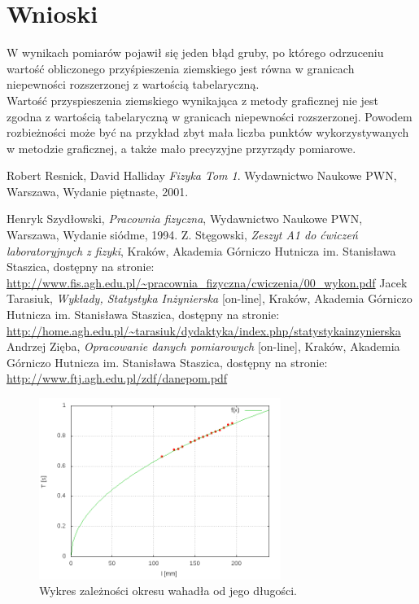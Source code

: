 \documentclass{article}
\begin{document}
\section{Wnioski}
	W wynikach pomiarów pojawił się jeden błąd gruby, po którego odrzuceniu wartość obliczonego przyśpieszenia ziemskiego jest równa w granicach niepewności rozszerzonej z wartością tabelaryczną. \\
	Wartość przyspieszenia ziemskiego wynikająca z metody graficznej nie jest zgodna z wartością tabelaryczną w granicach niepewności rozszerzonej. Powodem rozbieżności może być na przykład zbyt mała liczba punktów wykorzystywanych w metodzie graficznej, a także mało precyzyjne przyrządy pomiarowe. 
	



\begin{thebibliography}{9}
 
  Robert Resnick, David Halliday
  \emph{Fizyka Tom 1}.
    Wydawnictwo Naukowe PWN, Warszawa,
  Wydanie piętnaste,
  2001.


 Henryk Szydłowski,
 \emph{Pracownia fizyczna}, Wydawnictwo Naukowe PWN, Warszawa, Wydanie siódme, 1994.
  Z. Stęgowski,
  \emph{Zeszyt A1 do ćwiczeń laboratoryjnych z fizyki}, Kraków, Akademia Górniczo Hutnicza im. Stanisława Staszica, dostępny na stronie:\\
  \url{http://www.fis.agh.edu.pl/~pracownia_fizyczna/cwiczenia/00_wykon.pdf}
 Jacek Tarasiuk,
 \emph{Wykłady, Statystyka Inżynierska} [on-line], Kraków, Akademia Górniczo Hutnicza im. Stanisława Staszica, dostępny na stronie:\\
  \url{http://home.agh.edu.pl/~tarasiuk/dydaktyka/index.php/statystykainzynierska}
 Andrzej Zięba,
 \emph{Opracowanie danych pomiarowych} [on-line], Kraków, Akademia Górniczo Hutnicza im. Stanisława Staszica, dostępny na stronie:\\
  \url{http://www.ftj.agh.edu.pl/zdf/danepom.pdf}
  \label{statystyka}



\end{thebibliography}
\vspace{2cm}
\newpage
	\begin{figure}[p]
		\centering
		\includegraphics[width=0.7\textwidth]{wykres_T/wykres1.png}
		\caption{Wykres zależności okresu wahadła od jego długości.}
		\label{wykres1}
	\end{figure}
	
\end{document}
